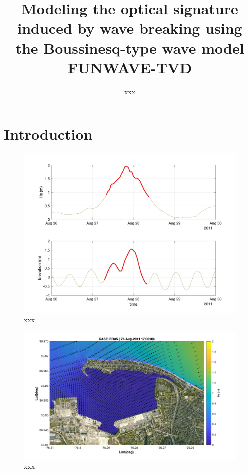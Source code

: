 \documentclass[preprint,12pt,authoryear]{elsarticle}
\begin{document}
\begin{frontmatter}

\title{Modeling the optical signature induced by wave breaking using the Boussinesq-type wave model FUNWAVE-TVD
}


\author[first]{xxx}

\address[first]{xxx}

\begin{abstract}


\end{abstract}


\begin{keyword}

\end{keyword}

\end{frontmatter}

\linenumbers

\section{Introduction}


\begin{figure}
\centering
\includegraphics[width=\textwidth]{./figures/nearcom_wave_flow.jpg}
\caption{xxx }
\label{boundary}
\centering
\end{figure}

\begin{figure}
\centering
\includegraphics[width=\textwidth]{./figures/nearcom_hs_ERA5_55.jpg}
\caption{xxx }
\label{boundary}
\centering
\end{figure}
\end{document}
